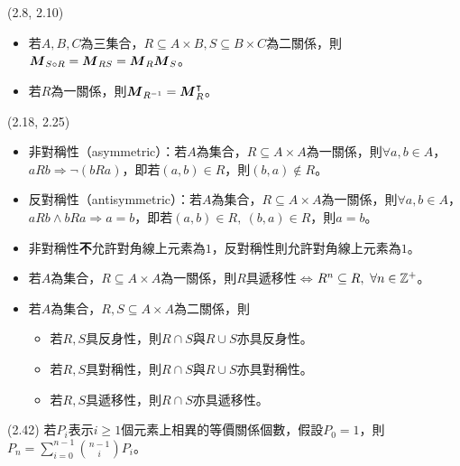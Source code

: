 \item \begin{theorem}{(2.8, 2.10)} \quad\quad
    \begin{itemize}
        \item 若$A, B, C$為三集合，$R \subseteq A \times B, S \subseteq B \times C$為二關係，則$\boldsymbol{M}_{S \circ R} = \boldsymbol{M}_{RS} = \boldsymbol{M}_{R}\boldsymbol{M}_{S}$。
        \item 若$R$為一關係，則$\boldsymbol{M}_{R^{-1}} = \boldsymbol{M}_{R}^\intercal$。
    \end{itemize}
\end{theorem}

\item \begin{theorem}{(2.18, 2.25)} \quad\quad
    \begin{itemize}
        \item 非對稱性（asymmetric）：若$A$為集合，$R \subseteq A \times A$為一關係，則$\forall a, b \in A$，$aRb \Rightarrow \lnot(bRa)$，即若$(a, b) \in R$，則$(b, a) \notin R$。
        \item 反對稱性（antisymmetric）：若$A$為集合，$R \subseteq A \times A$為一關係，則$\forall a, b \in A$，$aRb \land bRa \Rightarrow a = b$，即若$(a, b) \in R, \ (b, a) \in R$，則$a = b$。
        \item 非對稱性\textbf{不}允許對角線上元素為$1$，反對稱性則允許對角線上元素為$1$。
        \item 若$A$為集合，$R \subseteq A \times A$為一關係，則$R$具遞移性$\iff$$R^n \subseteq R, \ \forall n \in \mathbb{Z}^+$。
        \item 若$A$為集合，$R, S \subseteq A \times A$為二關係，則
        \begin{itemize}
            \item 若$R, S$具反身性，則$R \cap S$與$R \cup S$亦具反身性。
            \item 若$R, S$具對稱性，則$R \cap S$與$R \cup S$亦具對稱性。
            \item 若$R, S$具遞移性，則$R \cap S$亦具遞移性。
        \end{itemize}
    \end{itemize}
\end{theorem}

\item \begin{theorem}{(2.42)} 若$P_i$表示$i \ge 1$個元素上相異的等價關係個數，假設$P_0 = 1$，則$P_n = \sum_{i = 0}^{n - 1}\binom{n - 1}{i}P_i$。
\end{theorem}

